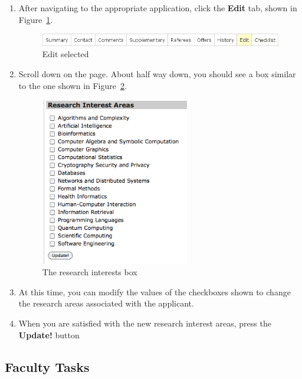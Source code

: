 \documentclass[titlepage]{article}
\begin{document}
\begin{enumerate}
\item After navigating to the appropriate application, click the
  \textbf{\textsf{Edit}} tab, shown in Figure~\ref{tResearch1}.

\begin{figure}[h!]
  \begin{center}
  \includegraphics[width=13cm]{apptabs_edit.png}
  \end{center}
  \caption{Edit selected}
  \label{tResearch1}
\end{figure}

\item Scroll down on the page. About half way down, you should see a box similar to the one shown in Figure~\ref{tResearch2}.

\begin{figure}[h!]
  \begin{center}
  \includegraphics[width=6.5cm]{applicant_research.png}
  \end{center}
  \caption{The research interests box}
  \label{tResearch2}
\end{figure}

\item At this time, you can modify the values of the checkboxes shown to change the research areas associated with the applicant.
\item  When you are satisfied with the new research interest areas, press the \textbf{\textsf{Update!}} button

\end{enumerate}

\subsection{Faculty Tasks}
\end{document}
